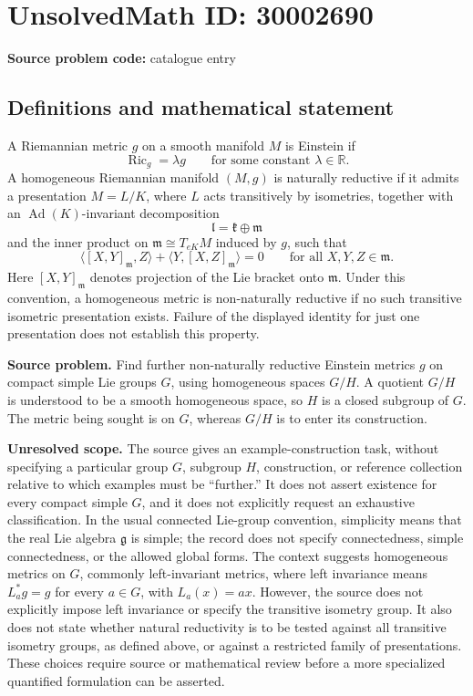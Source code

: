 \documentclass[11pt]{article}
\newcommand{\R}{\mathbb{R}}
\begin{document}
\section*{UnsolvedMath ID: 30002690}
\textbf{Source problem code:} catalogue entry
\subsection{Definitions and mathematical statement}
A Riemannian metric \(g\) on a smooth manifold \(M\) is Einstein if
\[
\operatorname{Ric}_g=\lambda g
\qquad\text{for some constant }\lambda\in\R.
\]
A homogeneous Riemannian manifold \((M,g)\) is naturally reductive if it admits a presentation \(M=L/K\), where \(L\) acts transitively by isometries, together with an \(\operatorname{Ad}(K)\)-invariant decomposition
\[
\mathfrak l=\mathfrak k\oplus\mathfrak m
\]
and the inner product on \(\mathfrak m\cong T_{eK}M\) induced by \(g\), such that
\[
\langle [X,Y]_{\mathfrak m},Z\rangle
+\langle Y,[X,Z]_{\mathfrak m}\rangle=0
\qquad\text{for all }X,Y,Z\in\mathfrak m.
\]
Here \([X,Y]_{\mathfrak m}\) denotes projection of the Lie bracket onto \(\mathfrak m\). Under this convention, a homogeneous metric is non-naturally reductive if no such transitive isometric presentation exists. Failure of the displayed identity for just one presentation does not establish this property.

\textbf{Source problem.} Find further non-naturally reductive Einstein metrics \(g\) on compact simple Lie groups \(G\), using homogeneous spaces \(G/H\). A quotient \(G/H\) is understood to be a smooth homogeneous space, so \(H\) is a closed subgroup of \(G\). The metric being sought is on \(G\), whereas \(G/H\) is to enter its construction.

\textbf{Unresolved scope.} The source gives an example-construction task, without specifying a particular group \(G\), subgroup \(H\), construction, or reference collection relative to which examples must be ``further.'' It does not assert existence for every compact simple \(G\), and it does not explicitly request an exhaustive classification. In the usual connected Lie-group convention, simplicity means that the real Lie algebra \(\mathfrak g\) is simple; the record does not specify connectedness, simple connectedness, or the allowed global forms. The context suggests homogeneous metrics on \(G\), commonly left-invariant metrics, where left invariance means \(L_a^*g=g\) for every \(a\in G\), with \(L_a(x)=ax\). However, the source does not explicitly impose left invariance or specify the transitive isometry group. It also does not state whether natural reductivity is to be tested against all transitive isometry groups, as defined above, or against a restricted family of presentations. These choices require source or mathematical review before a more specialized quantified formulation can be asserted.
\end{document}
